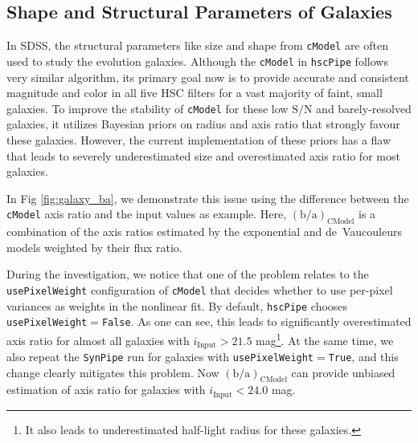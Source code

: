 \documentclass[useamsfonts]{pasj01}
\def\hscpipe{\texttt{hscPipe}}
\def\synpipe{\texttt{SynPipe}}
\def\cmodel{\texttt{cModel}}
\def\s2n{{$\mathrm{S}/\mathrm{N}$}}
\newcommand{\plan}[1]{\textcolor{blue} {\textbf{#1}}}
\begin{document}


\subsection{Shape and Structural Parameters of Galaxies}
    \label{ssec:shape}

    In SDSS, the structural parameters like size and shape from \cmodel{} are often 
    used to study the evolution galaxies. 
    Although the \cmodel{} in \hscpipe{} follows very similar algorithm, its primary 
    goal now is to provide accurate and consistent magnitude and color in all five 
    HSC filters for a vast majority of faint, small galaxies.  
    To improve the stability of \cmodel{} for these low \s2n{} and barely-resolved 
    galaxies, it utilizes Bayesian priors on radius and axis ratio that strongly 
    favour these galaxies. 
    However, the current implementation of these priors has a flaw that leads to 
    severely underestimated size and overestimated axis ratio for most galaxies.  
    
    In Fig \ref{fig:galaxy_ba}, we demonstrate this issue using the difference between 
    the \cmodel{} axis ratio and the input values as example.
    Here, $({\mathrm{b}/\mathrm{a}})_{\mathrm{CModel}}$ is a combination of the 
    axis ratios estimated by the exponential and de~Vaucouleurs models weighted by 
    their flux ratio. 
    
    During the investigation, we notice that one of the problem relates to the 
    \texttt{usePixelWeight} configuration of \cmodel{} that decides whether to 
    use per-pixel variances as weights in the nonlinear fit. 
    By default, \hscpipe{} chooses \texttt{usePixelWeight}$=$\texttt{False}. 
    As one can see, this leads to significantly overestimated axis ratio for almost 
    all galaxies with $i_{\mathrm{Input}}>21.5$ mag\footnote{It also leads to 
    underestimated half-light radius for these galaxies.}.
    At the same time, we also repeat the \synpipe{} run for galaxies with 
    \texttt{usePixelWeight}$=$\texttt{True}, and this change clearly mitigates
    this problem. 
    Now $({\mathrm{b}/\mathrm{a}})_{\mathrm{CModel}}$ can provide unbiased estimation 
    of axis ratio for galaxies with $i_{\mathrm{Input}}< 24.0$ mag. 
    
\end{document}

